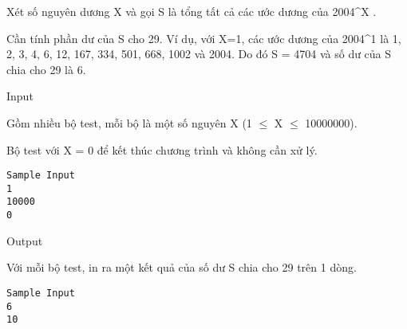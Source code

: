 



   Xét số nguyên dương X và gọi S là tổng tất cả các ước dương của 2004^X .  

   Cần tính phần dư của S cho 29. Ví dụ, với X=1, các ước dương của 2004^1 là 1, 2, 3, 4, 6, 12, 167, 334, 501, 668, 1002 và 2004. Do đó S = 4704  và số dư của S chia cho 29 là 6.  

       Input     

   Gồm nhiều bộ test, mỗi bộ là một số nguyên X (1  $\le$  X  $\le$  10000000).  

   Bộ test với X = 0 để kết thúc chương trình và không cần xử lý.  
\begin{verbatim}
Sample Input
1 
10000 
0
\end{verbatim}     Output    



   Với mỗi bộ test, in ra một kết quả của số dư S chia cho 29 trên 1 dòng.  
\begin{verbatim}
Sample Input
6 
10 
\end{verbatim}
